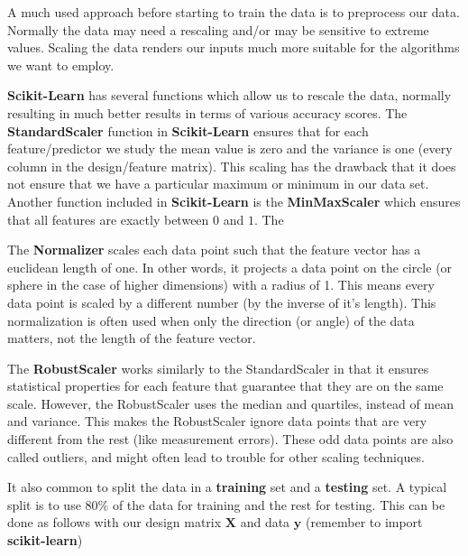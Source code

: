 \documentclass{beamer}
\newenvironment{doconceexercise}{}{}
\newcounter{doconceexercisecounter}
\newcounter{doconce:movie:counter}
\begin{document}
\begin{frame}
\begin{doconceexercise}
\begin{verbatim}
\end{verbatim}



\end{doconceexercise}

\begin{doconceexercise}

                             

A much used approach before starting to train the data is  to preprocess our
data. Normally the data may need a rescaling and/or may be sensitive
to extreme values. Scaling the data renders our inputs much more
suitable for the algorithms we want to employ.

\textbf{Scikit-Learn} has several functions which allow us to rescale the
data, normally resulting in much better results in terms of various
accuracy scores.  The \textbf{StandardScaler} function in \textbf{Scikit-Learn}
ensures that for each feature/predictor we study the mean value is
zero and the variance is one (every column in the design/feature
matrix).  This scaling has the drawback that it does not ensure that
we have a particular maximum or minimum in our data set. Another
function included in \textbf{Scikit-Learn} is the \textbf{MinMaxScaler} which
ensures that all features are exactly between $0$ and $1$. The

The \textbf{Normalizer} scales each data
point such that the feature vector has a euclidean length of one. In other words, it
projects a data point on the circle (or sphere in the case of higher dimensions) with a
radius of 1. This means every data point is scaled by a different number (by the
inverse of it’s length).
This normalization is often used when only the direction (or angle) of the data matters,
not the length of the feature vector.

The \textbf{RobustScaler} works similarly to the StandardScaler in that it
ensures statistical properties for each feature that guarantee that
they are on the same scale. However, the RobustScaler uses the median
and quartiles, instead of mean and variance. This makes the
RobustScaler ignore data points that are very different from the rest
(like measurement errors). These odd data points are also called
outliers, and might often lead to trouble for other scaling
techniques.

It also common to split the data in a \textbf{training} set and a \textbf{testing} set. A typical split is to use $80\%$ of the data for training and the rest
for testing. This can be done as follows with our design matrix $\bm{X}$ and data $\bm{y}$ (remember to import \textbf{scikit-learn})




\end{doconceexercise}
\end{frame}
\end{document}
